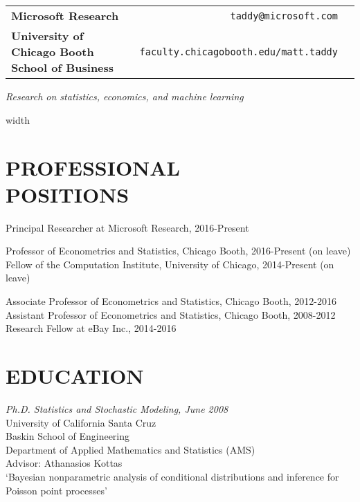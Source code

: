 \documentclass[margin,line]{res}
\begin{document}

\begin{resume}

\medskip
\section{} 
\vspace{.05in}
\begin{tabular}{@{}p{3in}rp{2in}}
{\bf Microsoft Research} & {\tt taddy@microsoft.com}\\
{\bf University of Chicago Booth School of Business} & {\tt faculty.chicagobooth.edu/matt.taddy} 
\end{tabular}

{\it Research on statistics, economics, and machine learning}


\vspace{.5cm}
\leaders\vrule width \textwidth\vskip0.4pt


\section{\bf PROFESSIONAL\\ POSITIONS}

Principal Researcher at Microsoft Research, 2016-Present

\vspace{-.2cm}
Professor of Econometrics and Statistics, Chicago Booth,
2016-Present (on leave)\\
Fellow of the Computation Institute, University of Chicago, 2014-Present (on leave)

\vspace{-.2cm}
Associate Professor of Econometrics and Statistics, Chicago Booth,
2012-2016\\
Assistant Professor of Econometrics and Statistics, Chicago Booth,
2008-2012\\
Research Fellow at eBay Inc., 2014-2016


\section{\bf EDUCATION}

{\it Ph.D. Statistics and Stochastic Modeling, June 2008}\\
{\sc University of California Santa Cruz}\\
Baskin School of Engineering\\
Department of Applied Mathematics and Statistics (AMS)\\
Advisor: Athanasios Kottas\\
`Bayesian nonparametric analysis of conditional distributions and inference for Poisson point processes'


\end{resume}
\end{document}

